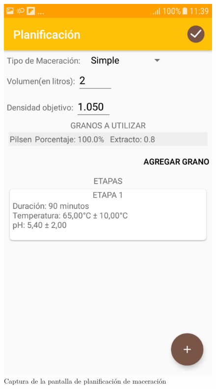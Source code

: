                 \begin{figure}[h]
                    \centering
                    \includegraphics[scale=0.2]{software/ScreenCapture/PlanningActivity.jpg}
                    \caption{Captura de la pantalla de planificación de maceración}
                    \label{fig:CapturaPlanAct}
                \end{figure}
